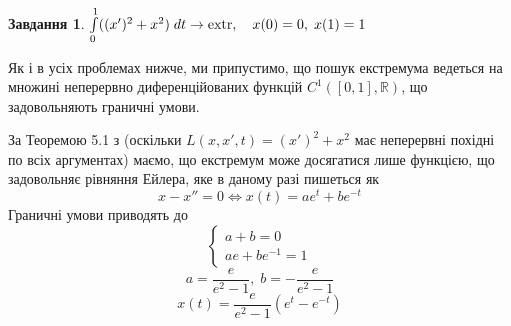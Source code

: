 \documentclass[12pt]{article} %
\title{}
\author{Олексій Леонтьєв}
\newtheorem{prob}{Завдання}
\newcommand{\dt}{\;dt}
\let\oldint\int
\renewcommand{\int}{\oldint\limits}
\newcommand{\extr}{\mbox{\normalfont extr}}
\begin{document}
\maketitle
\begin{prob}{}\; $\int_0^1((x')^2+x^2)\dt\to\extr,\quad x(0)=0,\;x(1)=1$\end{prob}
Як і в усіх проблемах нижче, ми припустимо, що пошук екстремума ведеться на множині неперервно диференційованих функцій $C^1([0,1],\mathbb{R})$,
що задовольняють граничні умови.

За Теоремою 5.1 з \cite{tb} (оскільки $L(x,x',t)=(x')^2+x^2$ має неперервні похідні по всіх аргументах)
маємо, що екстремум може досягатися лише функцією, що задовольняє рівняння Ейлера, яке в даному разі пишеться як
\[x-x''=0\iff x(t)=ae^t+be^{-t}\]
Граничні умови приводять до
\[\begin{cases}a+b=0\\ae+be^{-1}=1\end{cases}\]
\[a=\frac{e}{e^2-1},\;b=-\frac{e}{e^2-1}\]
\[x(t)=\frac{e}{e^2-1}(e^t-e^{-t})\]
\end{document}
